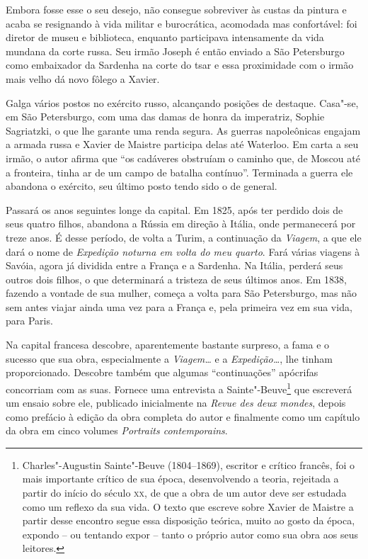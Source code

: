 Embora fosse esse o seu desejo, não consegue sobreviver às custas da
pintura e acaba se resignando à vida militar e burocrática, acomodada
mas confortável: foi diretor de museu e biblioteca, enquanto
participava intensamente da vida mundana da corte russa. Seu irmão
Joseph é então enviado a São Petersburgo como embaixador da Sardenha na
corte do tsar e essa proximidade com o irmão mais velho dá novo fôlego
a Xavier. 

Galga vários postos no exército russo, alcançando posições de destaque.
Casa"-se, em São Petersburgo, com uma das damas de honra da imperatriz,
Sophie Sagriatzki, o que lhe garante uma renda segura. As guerras
napoleônicas engajam a armada russa e Xavier de Maistre participa delas
até Waterloo. Em carta a seu irmão, o autor afirma que ``os cadáveres
obstruíam o caminho que, de Moscou até a fronteira, tinha ar de um
campo de batalha contínuo''.  Terminada a guerra ele abandona o
exército, seu último posto tendo sido o de general. 

Passará os anos seguintes longe da capital. Em 1825, após ter perdido
dois de seus quatro filhos, abandona a Rússia em direção à Itália, onde
permanecerá por treze anos. É desse período, de volta a Turim, a
continuação da \textit{Viagem}, a que ele dará o nome de
\textit{Expedição noturna em volta do meu quarto}. Fará várias viagens
à Savóia, agora já dividida entre a França e a Sardenha. Na Itália,
perderá seus outros dois filhos, o que determinará a tristeza de seus
últimos anos. Em 1838, fazendo a vontade de sua mulher, começa a volta
para São Petersburgo, mas não sem antes viajar ainda uma vez para a
França e, pela primeira vez em sua vida, para Paris. 

Na capital francesa descobre, aparentemente bastante surpreso, a fama e
o sucesso que sua obra, especialmente a \textit{Viagem\ldots} e a
\textit{Expedição\ldots}, lhe tinham proporcionado. Descobre também que
algumas ``continuações'' apócrifas concorriam com as suas. Fornece uma
entrevista a Sainte"-Beuve\footnote{ Charles"-Augustin Sainte"-Beuve
(1804--1869), escritor e crítico francês, foi o mais importante crítico
de sua época, desenvolvendo a teoria, rejeitada a partir do início do
século \textsc{xx}, de que a obra de um autor deve ser estudada como um reflexo
da sua vida. O texto que escreve sobre Xavier de Maistre a partir desse
encontro segue essa disposição teórica, muito ao gosto da época,
expondo -- ou tentando expor -- tanto o próprio autor como sua obra aos
seus leitores.} que escreverá um ensaio sobre ele, publicado
inicialmente na \textit{Revue des deux mondes}, depois como prefácio à
edição da obra completa do autor e finalmente como um capítulo da obra
em cinco volumes \textit{Portraits contemporains}. 

